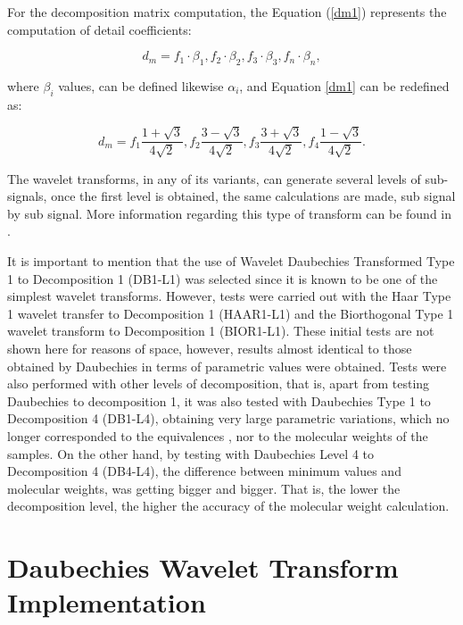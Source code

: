 \documentclass[a4paper]{llncs}
\begin{document}
\noindent For the decomposition matrix computation, the Equation (\ref{dm1}) represents the computation of detail coefficients:

\begin{equation}
d_m=  f_1 \cdot \beta_1,  f_2 \cdot \beta_2, f_3 \cdot \beta_3, f_n \cdot \beta_n,
\label{dm1}
\end{equation}

\noindent where $\beta_i$ values, can be defined likewise $\alpha_i$, and Equation \ref{dm1} can be redefined as:

\begin{equation}
d_{m} =  f_{1} \frac{1+\sqrt{3}}{4 \sqrt{2}}, f_{2} \frac{3-\sqrt{3}}{4 \sqrt{2}}, 
f_{3} \frac{3+\sqrt{3}}{4 \sqrt{2}}, f_{4} \frac{1-\sqrt{3}}{4 \sqrt{2}}. 
\label{dm2}
\end{equation}


\noindent The wavelet transforms, in any of its variants, can generate several levels of sub-signals, once the first level is obtained, the same calculations are made, sub signal by sub signal. More information regarding this type of transform can be found in \cite{Walker}.

It is important to mention that the use of Wavelet Daubechies Transformed Type 1 to Decomposition 1 (DB1-L1) was selected since it is known to be one of the simplest wavelet transforms. However, tests were carried out with the Haar Type 1 wavelet transfer to Decomposition 1 (HAAR1-L1) and the Biorthogonal Type 1 wavelet transform to Decomposition 1 (BIOR1-L1). These initial tests are not shown here for reasons of space, however, results almost identical to those obtained by Daubechies in terms of parametric values ​​were obtained. Tests were also performed with other levels of decomposition, that is, apart from testing Daubechies to decomposition 1, it was also tested with Daubechies Type 1 to Decomposition 4 (DB1-L4), obtaining very large parametric variations, which no longer corresponded to the equivalences , nor to the molecular weights of the samples. On the other hand, by testing with Daubechies Level 4 to Decomposition 4 (DB4-L4), the difference between minimum values ​​and molecular weights, was getting bigger and bigger. That is, the lower the decomposition level, the higher the accuracy of the molecular weight calculation.

\section{Daubechies Wavelet Transform Implementation}
\end{document}
